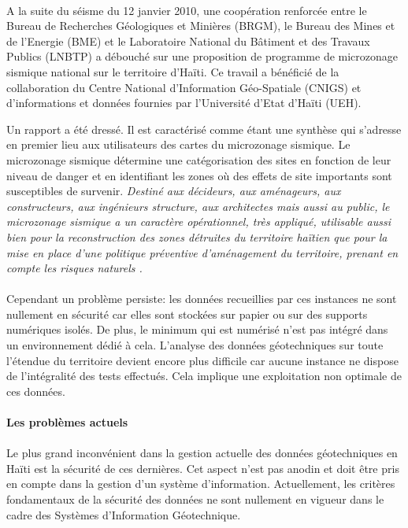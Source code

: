 \paragraph{}
A la suite du séisme du 12 janvier 2010, une coopération renforcée entre le Bureau de
Recherches Géologiques et Minières (BRGM), le Bureau des Mines et de l’Energie (BME) et le
Laboratoire National du Bâtiment et des Travaux Publics (LNBTP) a débouché sur une
proposition de programme de microzonage sismique national sur le territoire d’Haïti.
Ce travail a bénéficié de la collaboration du
Centre National d’Information Géo-Spatiale (CNIGS) et d’informations et données fournies par
l’Université d’Etat d’Haïti (UEH).
\par 
Un rapport \cite{bertil63100equipe} a été dressé. Il est caractérisé comme étant une synthèse qui s’adresse en premier 
lieu aux utilisateurs des cartes du microzonage sismique.
Le microzonage sismique détermine une catégorisation des sites
en fonction de leur niveau de danger et en identifiant les zones où des effets de site
importants sont susceptibles de survenir.
\textit{
         Destiné aux décideurs, aux aménageurs, aux
constructeurs, aux ingénieurs structure, aux architectes mais aussi au public, le microzonage
sismique a un caractère opérationnel, très appliqué, utilisable aussi bien pour la
reconstruction des zones détruites du territoire haïtien que pour la mise en place d’une
politique préventive d’aménagement du territoire, prenant en compte les risques naturels
\cite{bertil63100equipe}.
}

\paragraph{}
Cependant un problème persiste: les données recueillies par ces instances
ne sont nullement en sécurité car elles sont stockées sur papier ou sur des supports numériques isolés.
De plus, le minimum qui est numérisé n'est pas intégré dans un environnement 
dédié à cela.
L'analyse des données géotechniques sur toute l'étendue du territoire devient
encore plus difficile car aucune instance ne dispose de l'intégralité des tests effectués.
Cela implique une exploitation non optimale de ces données.
\paragraph{Les problèmes actuels}
\paragraph{}
Le plus grand inconvénient dans la gestion actuelle des données géotechniques
en Haïti est la sécurité de ces dernières. 
Cet aspect n'est pas anodin et doit être pris en compte dans la gestion d'un système
d'information.
Actuellement, les critères fondamentaux de la sécurité des données ne sont nullement en 
vigueur dans le cadre des Systèmes d'Information Géotechnique.
